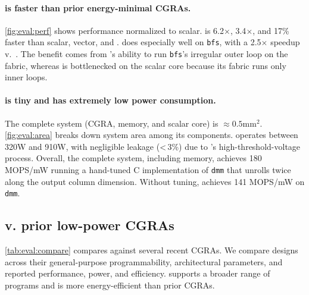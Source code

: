 \paragraph{\riptide is faster than prior energy-minimal CGRAs.}
\autoref{fig:eval:perf} shows performance normalized to scalar.
%
\riptide is 6.2$\times$, 3.4$\times$, and 17\% faster than scalar, vector, and \snafu.
%
%
%
%
% 
\riptide does especially well on {\tt bfs}, with a 2.5$\times$ speedup v.\ \snafu. The benefit comes
from \riptide's ability to run {\tt bfs}'s irregular outer loop on the fabric, whereas
% 
\snafu is bottlenecked on the scalar core because its fabric runs only inner loops. %
% 

\figRipTideArea
\tabRipTideEvalCompare
\figRipTidePrimaryCompilerResults

\paragraph{\riptide is tiny and has extremely low power consumption.}
\label{sec:eval:power_area}
The complete \riptide system (CGRA, memory, and scalar core) is $\approx 0.5\text{mm}^2$.
\autoref{fig:eval:area} breaks down system area among its components.
\riptide operates between 320\textmu W and 910\textmu W,
with negligible leakage (<\,3\%) due to \riptide's high-threshold-voltage process.
% 
Overall, the complete system, including memory, achieves
180 MOPS/mW running a hand-tuned C implementation of {\tt dmm} that unrolls twice along the output column dimension.
% 
Without tuning, \riptide achieves 141 MOPS/mW on {\tt dmm}.

\subsection{\riptide v. prior low-power CGRAs}
\autoref{tab:eval:compare} compares \riptide against several recent CGRAs.
% 
We compare designs across their general-purpose programmability, architectural parameters, and reported performance, power, and efficiency.
% 
\riptide supports a broader range of programs and is more energy-efficient than prior CGRAs.
%

